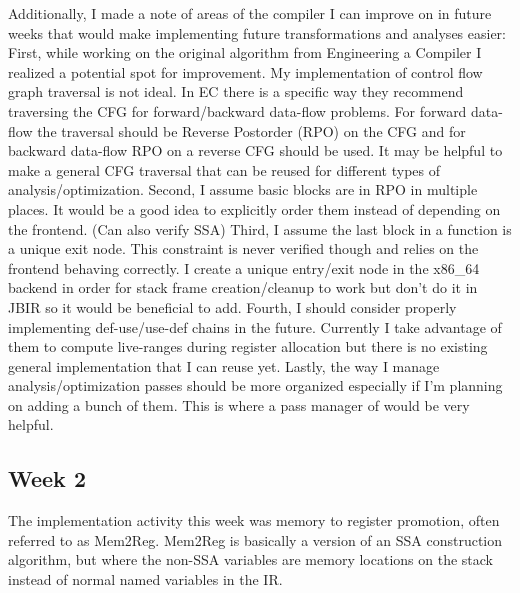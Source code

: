\documentclass[11pt, a4paper, titlepage]{article}
\begin{document}
Additionally, I made a note of areas of the compiler I can improve on in future weeks that would make implementing future transformations and analyses easier:
First, while working on the original algorithm from Engineering a Compiler I realized a potential spot for improvement.
My implementation of control flow graph traversal is not ideal.
In EC there is a specific way they recommend traversing the CFG for forward/backward data-flow problems.
For forward data-flow the traversal should be Reverse Postorder (RPO) on the CFG and for backward data-flow RPO on a reverse CFG should be used.
It may be helpful to make a general CFG traversal that can be reused for different types of analysis/optimization.
Second, I assume basic blocks are in RPO in multiple places.
It would be a good idea to explicitly order them instead of depending on the frontend.
(Can also verify SSA)
Third, I assume the last block in a function is a unique exit node.
This constraint is never verified though and relies on the frontend behaving correctly.
I create a unique entry/exit node in the x86\_64 backend in order for stack frame creation/cleanup to work but don't do it in JBIR so it would be beneficial to add.
Fourth, I should consider properly implementing def-use/use-def chains in the future.
Currently I take advantage of them to compute live-ranges during register allocation but there is no existing general implementation that I can reuse yet.
Lastly, the way I manage analysis/optimization passes should be more organized especially if I'm planning on adding a bunch of them.
This is where a pass manager of would be very helpful.

\subsection{Week 2} 
The implementation activity this week was memory to register promotion, often referred to as Mem2Reg. Mem2Reg is basically a version of an SSA construction algorithm, but where the non-SSA variables are memory locations on the stack instead of normal named variables in the IR.
\end{document}

